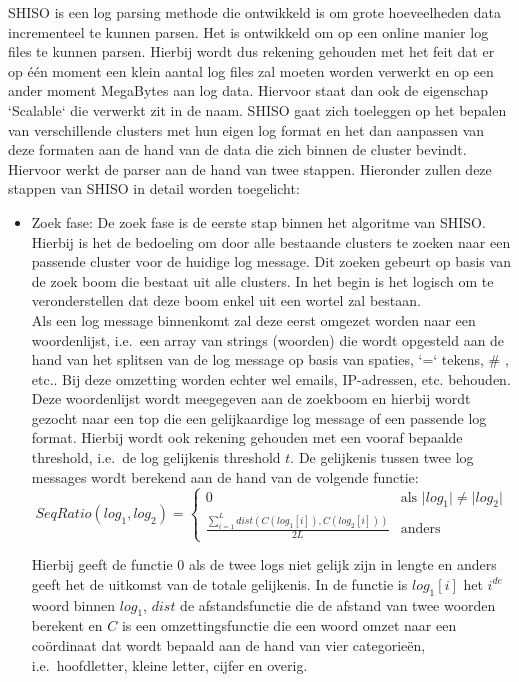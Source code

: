 SHISO is een log parsing methode die ontwikkeld is om grote hoeveelheden data incrementeel te kunnen parsen. Het is ontwikkeld om op een online manier log files te kunnen parsen. Hierbij wordt dus rekening gehouden met het feit dat er op één moment een klein aantal log files zal moeten worden verwerkt en op een ander moment MegaBytes aan log data. Hiervoor staat dan ook de eigenschap `Scalable` die verwerkt zit in de naam. SHISO gaat zich toeleggen op het bepalen van verschillende clusters met hun eigen log format en het dan aanpassen van deze formaten aan de hand van de data die zich binnen de cluster bevindt. Hiervoor werkt de parser aan de hand van twee stappen. Hieronder zullen deze stappen van SHISO in detail worden toegelicht: 
\begin{itemize}
    \item Zoek fase: De zoek fase is de eerste stap binnen het algoritme van SHISO. Hierbij is het de bedoeling om door alle bestaande clusters te zoeken naar een passende cluster voor de huidige log message. Dit zoeken gebeurt op basis van de zoek boom die bestaat uit alle clusters. In het begin is het logisch om te veronderstellen dat deze boom enkel uit een wortel zal bestaan.\\
    
    Als een log message binnenkomt zal deze eerst omgezet worden naar een woordenlijst, i.e.\ een array van strings (woorden) die wordt opgesteld aan de hand van het splitsen van de log message op basis van spaties, `=` tekens, \# , etc.. Bij deze omzetting worden echter wel emails, IP-adressen, etc. behouden. Deze woordenlijst wordt meegegeven aan de zoekboom en hierbij wordt gezocht naar een top die een gelijkaardige log message of een passende log format. Hierbij wordt ook rekening gehouden met een vooraf bepaalde threshold, i.e.\ de log gelijkenis threshold $t$. De gelijkenis tussen twee log messages wordt berekend aan de hand van de volgende functie:\\
    \[SeqRatio(log_{1}, log_{2}) = \begin{cases}
        0 & \text{als } \lvert log_{1} \rvert \neq \lvert log_{2} \rvert\\
        \frac{\sum_{i=1}^{L} dist(C(log_{1}[i]), C(log_{2}[i]))}{2L} & \text{anders}
    \end{cases}\]
    
    Hierbij geeft de functie 0 als de twee logs niet gelijk zijn in lengte en anders geeft het de uitkomst van de totale gelijkenis. In de functie is $log_{1}[i]$ het $i^{de}$ woord binnen $log_{1}$, $dist$ de afstandsfunctie die de afstand van twee woorden berekent en $C$ is een omzettingsfunctie die een woord omzet naar een coördinaat dat wordt bepaald aan de hand van vier categorieën, i.e.\ hoofdletter, kleine letter, cijfer en overig.\\
    

\end{itemize}
